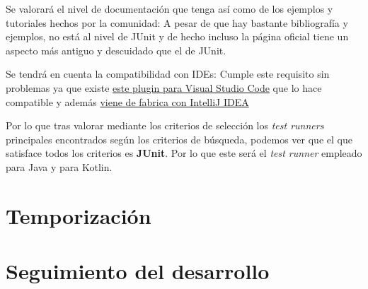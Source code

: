 \begin{todolist}
    \item Se valorará el nivel de documentación que tenga así como de los
    ejemplos y tutoriales hechos por la comunidad: A pesar de que hay bastante
    bibliografía y ejemplos, no está al nivel de JUnit y de hecho incluso la
    página oficial tiene un aspecto más antiguo y descuidado que el de JUnit.
    \item[\xcmark] Se tendrá en cuenta la compatibilidad con IDEs: Cumple este
    requisito sin problemas ya que existe
    \href{https://code.visualstudio.com/docs/java/java-testing}{este plugin para
    Visual Studio Code} que lo hace compatible y además
    \href{https://www.jetbrains.com/help/idea/testng.html}{viene de fabrica con
    IntelliJ IDEA}
\end{todolist}


Por lo que tras valorar mediante los criterios de selección los \emph{test
runners} principales encontrados según los criterios de búsqueda, podemos ver
que el que satisface todos los criterios es \textbf{JUnit}. Por lo que este será
el \emph{test runner} empleado para Java y para Kotlin.


\section{Temporización}

\section{Seguimiento del desarrollo}

